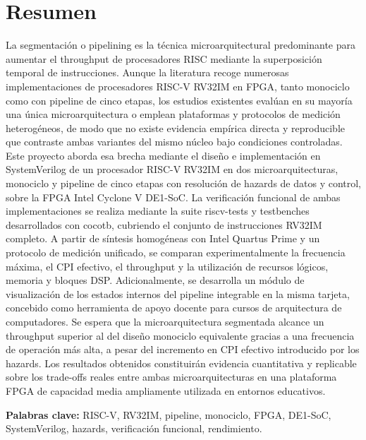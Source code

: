 \section{Resumen}
\label{sec:resumen}

La segmentación o pipelining es la técnica microarquitectural predominante para aumentar el throughput de procesadores RISC mediante la superposición temporal de instrucciones. Aunque la literatura recoge numerosas implementaciones de procesadores RISC-V RV32IM en FPGA, tanto monociclo como con pipeline de cinco etapas, los estudios existentes evalúan en su mayoría una única microarquitectura o emplean plataformas y protocolos de medición heterogéneos, de modo que no existe evidencia empírica directa y reproducible que contraste ambas variantes del mismo núcleo bajo condiciones controladas.
Este proyecto aborda esa brecha mediante el diseño e implementación en SystemVerilog de un procesador RISC-V RV32IM en dos microarquitecturas, monociclo y pipeline de cinco etapas con resolución de hazards de datos y control, sobre la FPGA Intel Cyclone V DE1-SoC. La verificación funcional de ambas implementaciones se realiza mediante la suite riscv-tests y testbenches desarrollados con cocotb, cubriendo el conjunto de instrucciones RV32IM completo. A partir de síntesis homogéneas con Intel Quartus Prime y un protocolo de medición unificado, se comparan experimentalmente la frecuencia máxima, el CPI efectivo, el throughput y la utilización de recursos lógicos, memoria y bloques DSP. Adicionalmente, se desarrolla un módulo de visualización de los estados internos del pipeline integrable en la misma tarjeta, concebido como herramienta de apoyo docente para cursos de arquitectura de computadores.
Se espera que la microarquitectura segmentada alcance un throughput superior al del diseño monociclo equivalente gracias a una frecuencia de operación más alta, a pesar del incremento en CPI efectivo introducido por los hazards. Los resultados obtenidos constituirán evidencia cuantitativa y replicable sobre los trade-offs reales entre ambas microarquitecturas en una plataforma FPGA de capacidad media ampliamente utilizada en entornos educativos.

\textbf{Palabras clave:} RISC-V, RV32IM, pipeline, monociclo, FPGA, DE1-SoC, SystemVerilog, hazards, verificación funcional, rendimiento.
